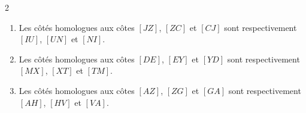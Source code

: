 \begin{exercice*}
\begin{enumerate}
\begin{tikzpicture}[baseline,scale = 0.3]
            \end{tikzpicture}
        \end{enumerate}

\end{exercice*}
\begin{corrige}
    \phantom{rrr}    
    \begin{multicols}2
        \begin{enumerate}
            \item Les côtés homologues aux côtes $[JZ]$, $[ZC]$ et $[CJ]$ sont respectivement 
            $[IU]$, $[UN]$ et $[NI]$.
            \item Les côtés homologues aux côtes $[DE]$, $[EY]$ et $[YD]$ sont respectivement 
            $[MX]$, $[XT]$ et $[TM]$.
            \item Les côtés homologues aux côtes $[AZ]$, $[ZG]$ et $[GA]$ sont respectivement 
            $[AH]$, $[HV]$ et $[VA]$.
        \end{enumerate}
    \end{multicols}
\end{corrige}

